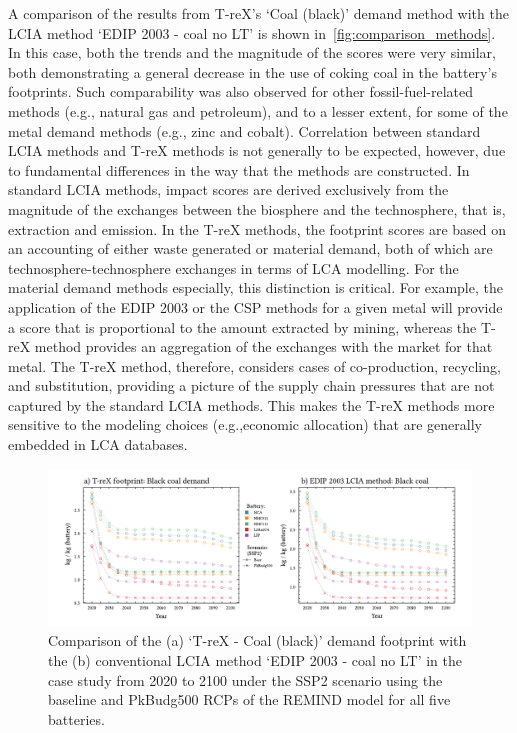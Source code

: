 \documentclass[a4paper,fleqn]{cas-dc}
\begin{document}
A comparison of the results from T-reX's `Coal (black)' demand method with the LCIA method `EDIP 2003 - coal no LT' is shown in~\autoref{fig:comparison_methods}. In this case, both the trends and the magnitude of the scores were very similar, both demonstrating a general decrease in the use of coking coal in the battery's footprints. Such comparability was also observed for other fossil-fuel-related methods (e.g., natural gas and petroleum), and to a lesser extent, for some of the metal demand methods (e.g., zinc and cobalt). Correlation between standard LCIA methods and T-reX methods is not generally to be expected, however, due to fundamental differences in the way that the methods are constructed. In standard LCIA methods, impact scores are derived exclusively from the magnitude of the exchanges between the biosphere and the technosphere, that is, extraction and emission. In the T-reX methods, the footprint scores are based on an accounting of either waste generated or material demand, both of which are technosphere-technosphere exchanges in terms of LCA modelling. For the material demand methods especially, this distinction is critical. For example, the application of the EDIP 2003 or the CSP methods for a given metal will provide a score that is proportional to the amount extracted by mining, whereas the T-reX method provides an aggregation of the exchanges with the market for that metal. The T-reX method, therefore, considers cases of co-production, recycling, and substitution, providing a picture of the supply chain pressures that are not captured by the standard LCIA methods. This makes the T-reX methods more sensitive to the modeling choices (e.g.,economic allocation) that are generally embedded in LCA databases.

\begin{figure}[htbp]
	\centering
	\includegraphics[width=16cm]{figs/T-reX-coalANDedip.pdf}
	\caption{Comparison of the (a) `T-reX - Coal (black)' demand footprint with the (b) conventional LCIA method `EDIP 2003 - coal no LT'  in the case study from 2020 to 2100 under the SSP2 scenario using the baseline and PkBudg500 RCPs of the REMIND model for all five batteries.}\label{fig:comparison_methods}
\end{figure}
\end{document}
